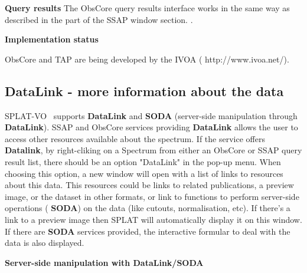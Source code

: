 \documentclass[twoside,11pt,nolof]{starlink}
\providecommand{\SPLAT}{\textsf{SPLAT-VO }}
\providecommand{\subheading}[1]{\textbf{\large{#1}}}
\begin{document}
\subheading {Query results}
The ObsCore  query results interface works in the same way as described in  the   part of  the  SSAP window section.
 \latex{(\S\ref{query_results})}. 


\subheading{Implementation status}

ObsCore and TAP are  being developed by the IVOA
(
{http://www.ivoa.net/}).


\newpage
\subsection{DataLink - more information about the data}

\SPLAT\ supports \textbf{DataLink} and \textbf{SODA} (server-side manipulation through \textbf{DataLink}).
SSAP and ObsCore services providing  \textbf{DataLink} allows the user to access other resources available about the spectrum.
If the service offers \textbf{Datalink}, by right-cliking on a Spectrum from either an ObsCore or SSAP query result list, there should be an option "DataLink" in the pop-up menu.
When choosing this option, a new window will open with a list of links to resources about this data. This resources could be links to related publications, 
a preview image, or the dataset in other formats, or link to functions to perform server-side operations ( \textbf{SODA}) on the data (like cutouts, normalisation, etc).
If there's a link to a preview image then SPLAT will automatically display it on this window. If there are  \textbf{SODA}  services provided, the interactive formular to  deal with the data is also displayed.

\subheading{Server-side manipulation with DataLink/SODA}
\end{document}
